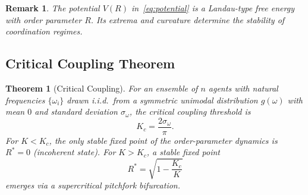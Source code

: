 \documentclass[twocolumn,10pt]{article}
\newtheorem{theorem}{Theorem}[section]
\newtheorem{remark}{Remark}[section]
\newcommand{\Kc}{K_c}
\newcommand{\sigmaomega}{\sigma_{\omega}}
\begin{document}
\begin{remark}
The potential $V(R)$ in~\eqref{eq:potential} is a Landau-type free energy with
order parameter $R$. Its extrema and curvature determine the stability of
coordination regimes.
\end{remark}




\subsection{Critical Coupling Theorem}

\begin{theorem}[Critical Coupling]
\label{thm:critical}
For an ensemble of $n$ agents with natural frequencies $\{\omega_i\}$ drawn
i.i.d.\ from a symmetric unimodal distribution $g(\omega)$ with mean $0$ and
standard deviation $\sigmaomega$, the critical coupling threshold is
\begin{equation}
\label{eq:kc}
  \Kc = \frac{2\sigmaomega}{\pi}.
\end{equation}
For $K < \Kc$, the only stable fixed point of the order-parameter dynamics is
$R^* = 0$ (incoherent state). For $K > \Kc$, a stable fixed point
\begin{equation}
\label{eq:rstar}
  R^* = \sqrt{1 - \frac{\Kc}{K}}
\end{equation}
emerges via a supercritical pitchfork bifurcation.
\end{theorem}
\end{document}
